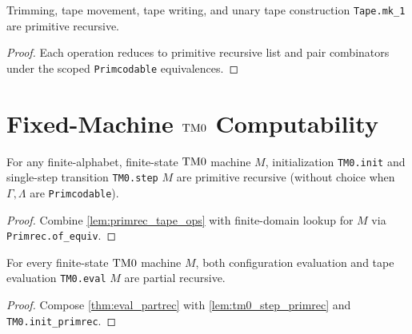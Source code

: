 \begin{lemma}
  \label{lem:primrec_tape_ops}
  \leanok
  Trimming, tape movement, tape writing, and unary tape construction \texttt{Tape.mk\_1} are primitive recursive.
\end{lemma}
\begin{proof}
  \leanok
  Each operation reduces to primitive recursive list and pair combinators under the scoped \texttt{Primcodable} equivalences.
\end{proof}

\chapter{Fixed-Machine $\mathrm{TM0}$ Computability}

\begin{lemma}
  \label{lem:tm0_step_primrec}
  \leanok
  For any finite-alphabet, finite-state $\mathrm{TM0}$ machine $M$, initialization \texttt{TM0.init} and single-step transition \texttt{TM0.step} $M$ are primitive recursive (without choice when $\Gamma, \Lambda$ are \texttt{Primcodable}).
\end{lemma}
\begin{proof}
  \leanok
  Combine \ref{lem:primrec_tape_ops} with finite-domain lookup for $M$ via \texttt{Primrec.of\_equiv}.
\end{proof}

\begin{theorem}
  \label{thm:tm0_eval_partrec}
  \leanok
  For every finite-state $\mathrm{TM0}$ machine $M$, both configuration evaluation and tape evaluation \texttt{TM0.eval} $M$ are partial recursive.
\end{theorem}
\begin{proof}
  \leanok
  Compose \ref{thm:eval_partrec} with \ref{lem:tm0_step_primrec} and \texttt{TM0.init\_primrec}.
\end{proof}

